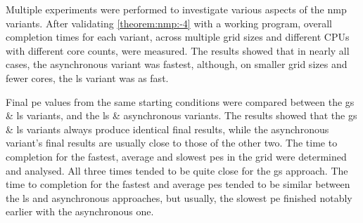 Multiple experiments were performed to investigate various aspects of the \gls{nmp} variants.  After validating \cref{theorem:nmp:-4} with a working program, overall completion times for each variant, across multiple grid sizes and different CPUs with different core counts, were measured.  The results showed that in nearly all cases, the asynchronous variant was fastest, although, on smaller grid sizes and fewer cores, the \gls{ls} variant was as fast.

Final \gls{pe} values from the same starting conditions were compared between the \gls{gs} \& \gls{ls} variants, and the \gls{ls} \& asynchronous variants.  The results showed that the \gls{gs} \& \gls{ls} variants always produce identical final results, while the asynchronous variant's final results are usually close to those of the other two.  The time to completion for the fastest, average and slowest \glspl{pe} in the grid were determined and analysed.  All three times tended to be quite close for the \gls{gs} approach.  The time to completion for the fastest and average \glspl{pe} tended to be similar between the \gls{ls} and asynchronous approaches, but usually, the slowest \gls{pe} finished notably earlier with the asynchronous one.




